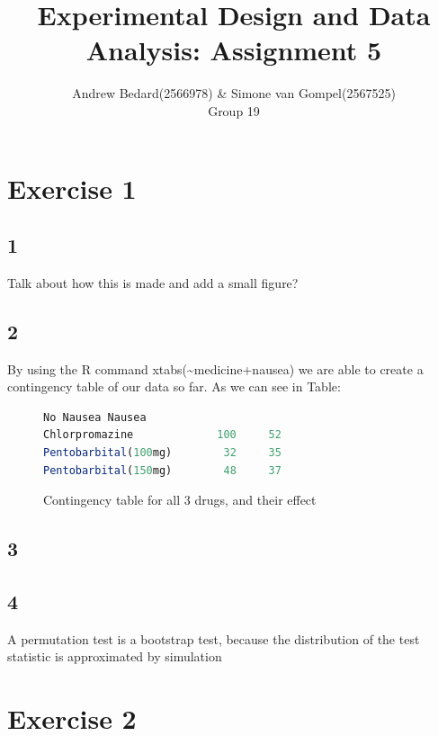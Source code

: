 \documentclass{article}
\title{Experimental Design and Data Analysis: Assignment 5}
\author{Andrew Bedard(2566978) \& Simone van Gompel(2567525) \\ Group 19}
\begin{document}
  \maketitle

  \section*{Exercise 1}
    \subsection*{1}
    Talk about how this is made and add a small figure?
    \subsection*{2}
    By using the R command xtabs(\textasciitilde medicine+nausea) we are able to create a contingency table of our data so far. As we can see in Table:
    \begin{figure}
    \begin{lstlisting}[language=R]
                     No Nausea Nausea
Chlorpromazine             100     52
Pentobarbital(100mg)        32     35
Pentobarbital(150mg)        48     37
    \end{lstlisting}
    \caption{Contingency table for all 3 drugs, and their effect}
    \end{figure}
    \subsection*{3}
    
    \subsection*{4}
    A permutation test is a bootstrap test, because the distribution of the test statistic is approximated by simulation
  \section*{Exercise 2}
\end{document}
